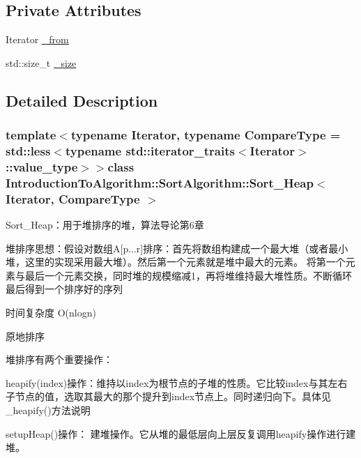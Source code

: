 \subsection*{Private Attributes}
\begin{DoxyCompactItemize}
\item 
Iterator \hyperlink{class_introduction_to_algorithm_1_1_sort_algorithm_1_1_sort___heap_a484d28581bfe39a387d90852e38ac36c}{\+\_\+from}
\item 
std\+::size\+\_\+t \hyperlink{class_introduction_to_algorithm_1_1_sort_algorithm_1_1_sort___heap_a57a42830d3b52d60d2ec1dfd11e2bda6}{\+\_\+size}
\end{DoxyCompactItemize}


\subsection{Detailed Description}
\subsubsection*{template$<$typename Iterator, typename Compare\+Type = std\+::less$<$typename std\+::iterator\+\_\+traits$<$\+Iterator$>$\+::value\+\_\+type$>$$>$class Introduction\+To\+Algorithm\+::\+Sort\+Algorithm\+::\+Sort\+\_\+\+Heap$<$ Iterator, Compare\+Type $>$}

Sort\+\_\+\+Heap：用于堆排序的堆，算法导论第6章 


\begin{DoxyItemize}
\item 堆排序思想：假设对数组\+A\mbox{[}p...r\mbox{]}排序：首先将数组构建成一个最大堆（或者最小堆，这里的实现采用最大堆）。然后第一个元素就是堆中最大的元素。 将第一个元素与最后一个元素交换，同时堆的规模缩减1，再将堆维持最大堆性质。不断循环最后得到一个排序好的序列
\item 时间复杂度 O(nlogn)
\item 原地排序
\end{DoxyItemize}

堆排序有两个重要操作：


\begin{DoxyItemize}
\item heapify(index)操作：维持以index为根节点的子堆的性质。它比较index与其左右子节点的值，选取其最大的那个提升到index节点上。同时递归向下。具体见\+\_\+heapify()方法说明
\item setup\+Heap()操作： 建堆操作。它从堆的最低层向上层反复调用heapify操作进行建堆。 
\end{DoxyItemize}

